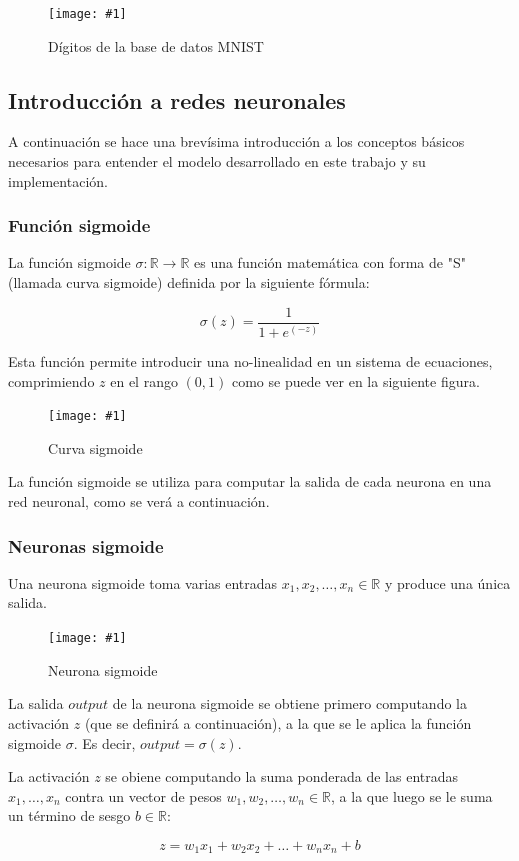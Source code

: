 \documentclass[a4paper, 10pt, twoside]{article}
\newcommand{\img}[3]{
  \begin{figure}[H]
    \begin{center}
      \texttt{[image: \#1]}
    \end{center}
    \caption{#2}
    \label{#3}
  \end{figure}
}
\begin{document}
\img{mnist-digits.png}{Dígitos de la base de datos MNIST}{img:mnist-digits}


\subsection{Introducción a redes neuronales}

A continuación se hace una brevísima introducción a los conceptos básicos
necesarios para entender el modelo desarrollado en este trabajo y su
implementación.


\subsubsection{Función sigmoide}

La función sigmoide $\sigma: \mathbb{R} \rightarrow \mathbb{R}$ es una función
matemática con forma de "S" (llamada curva sigmoide) definida por la siguiente
fórmula:

$$\sigma(z) = \frac{1}{1 + e^(-z)}$$

Esta función permite introducir una no-linealidad en un sistema de ecuaciones,
comprimiendo $z$ en el rango $(0, 1)$ como se puede ver en la siguiente figura.

\img{sigmoid-curve.png}{Curva sigmoide}{img:sigmoid-curve}

La función sigmoide se utiliza para computar la salida de cada neurona en una
red neuronal, como se verá a continuación.


\subsubsection{Neuronas sigmoide}

Una neurona sigmoide toma varias entradas $x_1, x_2, \ldots, x_n \in
\mathbb{R}$ y produce una única salida.

\img{neuron.png}{Neurona sigmoide}{img:neuron}

La salida $\mathit{output}$ de la neurona sigmoide se obtiene primero
computando la activación $z$ (que se definirá a continuación), a la que se le
aplica la función sigmoide $\sigma$. Es decir, $\mathit{output} = \sigma(z)$.

La activación $z$ se obiene computando la suma ponderada de las entradas $x_1,
\ldots, x_n$ contra un vector de pesos $w_1, w_2, \ldots, w_n \in \mathbb{R}$,
a la que luego se le suma un término de sesgo $b \in \mathbb{R}$:

$$z = w_1 x_1 + w_2 x_2 + \ldots + w_n x_n + b$$
\end{document}
